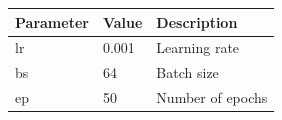 \begin{table}[htbp]
\centering
\begin{tabular}{lll}
\toprule
Parameter & Value & Description \\
\midrule
lr & 0.001 & Learning rate \\
bs & 64 & Batch size \\
ep & 50 & Number of epochs \\
\bottomrule
\end{tabular}
\end{table}
